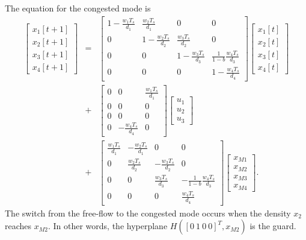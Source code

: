 The equation for the congested mode is
\begin{eqnarray}
\left[\begin{array}{c}
x_1[t+1]\\
x_2[t+1]\\
x_3[t+1]\\
x_4[t+1]\end{array}\right] & = & \left[\begin{array}{cccc}
1-\frac{w_1T_s}{d_1} & \frac{w_2T_s}{d_1} & 0 & 0\\
0 & 1-\frac{w_2T_s}{d_2} & \frac{w_3T_s}{d_2} & 0\\
0 & 0 & 1-\frac{w_3T_s}{d_3} & \frac{1}{1-b}\frac{w_4T_s}{d_3}\\
0 & 0 & 0 & 1-\frac{w_4T_s}{d_4}\end{array}\right]
\left[\begin{array}{c}
x_1[t]\\
x_2[t]\\
x_3[t]\\
x_4[t]\end{array}\right] \nonumber\\
& + & \left[\begin{array}{ccc}
0 & 0 & \frac{w_1T_s}{d_1}\\
0 & 0 & 0\\
0 & 0 & 0\\
0 & -\frac{w_4T_s}{d_4} & 0\end{array}\right]\left[\begin{array}{c}
u_1\\
u_2\\
u_3\end{array}\right] \nonumber\\
& + & \left[\begin{array}{cccc}
\frac{w_1T_s}{d_1} & -\frac{w_2T_s}{d_1} & 0 & 0\\
0 & \frac{w_2T_s}{d_2} & -\frac{w_3T_s}{d_2} & 0\\
0 & 0 & \frac{w_3T_s}{d_3} & -\frac{1}{1-b}\frac{w_4T_s}{d_3}\\
0 & 0 & 0 & \frac{w_4T_s}{d_4}\end{array}\right]
\left[\begin{array}{c}
x_{M1}\\
x_{M2}\\
x_{M3}\\
x_{M4}\end{array}\right]. \label{cflow}
\end{eqnarray}
The switch from the free-flow to the congested mode occurs when the density
 $x_2$ reaches $x_{M2}$. In other words, the hyperplane
$H([0 ~ 1 ~ 0 ~ 0]^T, x_{M2})$ is the guard.

